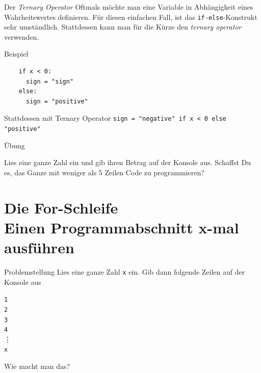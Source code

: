 \documentclass[algorithm,pgfplots,colortheme=dark]{cuzbeamer}
\newcommand{\py}[1]{\texttt{#1}}
\newcommand{\pybw}[1]{\texttt{#1}}
\begin{document}
\begin{fragile}{}
\begin{block}{Der \emph{Ternary Operator}}
\vspace{2pt}
Oftmals möchte man eine Variable in Abhängigkeit eines Wahrheitswertes definieren. Für diesen einfachen Fall, ist das \pybw{if-else}-Konstrukt sehr umständlich. Stattdessen kann man für die Kürze den \emph{ternary operator} verwenden. 
\end{block}
\vspace{12pt}
\pause
\begin{exampleblock}{Beispiel}
	\vspace{2pt}
	\begin{verbatim}
	if x < 0: 
	  sign = "sign"	
	else: 
	  sign = "positive"
	\end{verbatim}
\end{exampleblock}
\pause 
\begin{block}{Stattdessen mit Ternary Operator}
	\vspace{2pt}
	\py{sign = "negative" if x < 0 else "positive"}
\end{block}
\end{fragile}

\begin{frame}{Übung}

\begin{block}{}
	\vspace{2pt}
Lies eine ganze Zahl ein und gib ihren Betrag auf der Konsole aus. Schaffst Du es, das Ganze mit weniger als 5 Zeilen Code zu programmieren? 
\end{block}

\end{frame}

\section{Die For-Schleife \\ \footnotesize Einen Programmabschnitt x-mal ausführen}

\begin{frame}

\begin{block}{Problemstellung}
\vspace{2pt}
Lies eine ganze Zahl \py{x} ein. Gib dann folgende Zeilen auf der Konsole aus 

\texttt{1}\\
\texttt{2}\\
\texttt{3}\\
\texttt{4}\\
\vdots \\
\texttt{x}

\vspace{12pt}
Wie macht man das? 

\end{block}
\end{frame}
\end{document}
